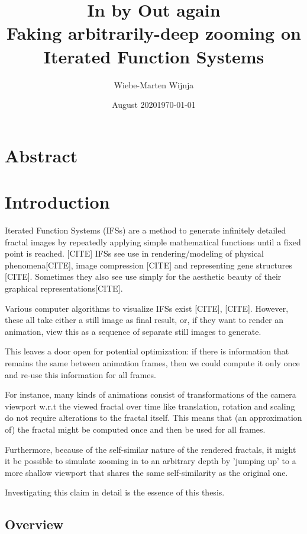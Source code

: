 \documentclass[11pt]{article}
\date{August 2020}
\author{Wiebe-Marten Wijnja}
\date{\today}
\title{\Huge In by Out again\\\medskip
\large Faking arbitrarily-deep zooming on Iterated Function Systems}
\begin{document}
\maketitle
\setcounter{tocdepth}{4}
\tableofcontents

\listoftodos


\section{Abstract}
\label{sec:org530208c}


\section{Introduction}
\label{sec:org50a1c6a}

Iterated Function Systems (IFSs) are a method to generate infinitely detailed fractal images 
by repeatedly applying simple mathematical functions until a fixed point is reached. [CITE]
IFSs see use in rendering/modeling of physical phenomena[CITE], image compression [CITE] and representing gene structures [CITE].
Sometimes they also see use simply for the aesthetic beauty of their graphical representations[CITE].

Various computer algorithms to visualize IFSs exist [CITE], [CITE].
However, these all take either a still image as final result, or, if they want to render an animation,
view this as a sequence of separate still images to generate.

This leaves a door open for potential optimization: if there is information that remains the same between animation frames, 
then we could compute it only once and re-use this information for all frames.

For instance, many kinds of animations consist of transformations of the camera viewport w.r.t the viewed fractal over time like translation, rotation and scaling do not require alterations to the fractal itself.
This means that (an approximation of) the fractal might be computed once and then be used for all frames.

Furthermore, because of the self-similar nature of the rendered fractals,
it might it be possible to simulate zooming in to an arbitrary depth by 'jumping up' to a more shallow viewport
that shares the same self-similarity as the original one. 

Investigating this claim in detail is the essence of this thesis.

\subsection{Overview}
\label{sec:orgbc0722e}
\end{document}
